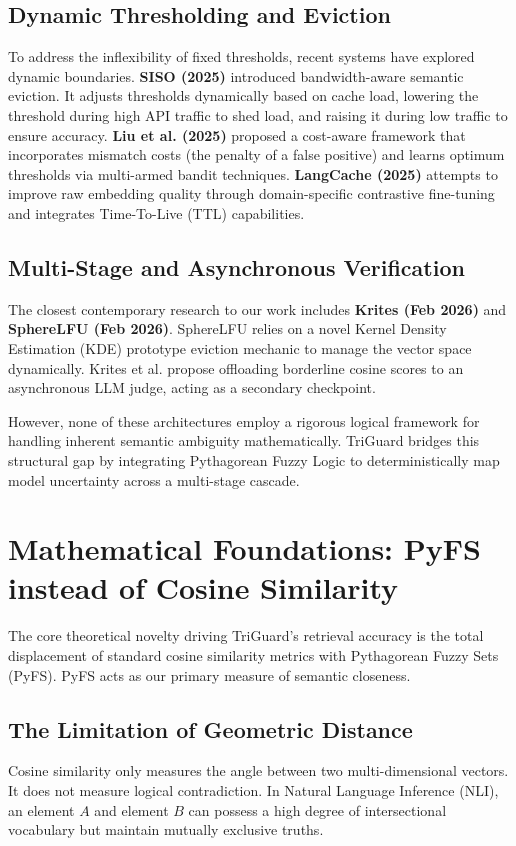 \documentclass[sigconf]{acmart}
\begin{document}
\subsection{Dynamic Thresholding and Eviction}
To address the inflexibility of fixed thresholds, recent systems have explored dynamic boundaries.
\textbf{SISO (2025)} introduced bandwidth-aware semantic eviction. It adjusts thresholds dynamically based on cache load, lowering the threshold during high API traffic to shed load, and raising it during low traffic to ensure accuracy. 
\textbf{Liu et al. (2025)} proposed a cost-aware framework that incorporates mismatch costs (the penalty of a false positive) and learns optimum thresholds via multi-armed bandit techniques.
\textbf{LangCache (2025)} attempts to improve raw embedding quality through domain-specific contrastive fine-tuning and integrates Time-To-Live (TTL) capabilities.

\subsection{Multi-Stage and Asynchronous Verification}
The closest contemporary research to our work includes \textbf{Krites (Feb 2026)} and \textbf{SphereLFU (Feb 2026)}. SphereLFU relies on a novel Kernel Density Estimation (KDE) prototype eviction mechanic to manage the vector space dynamically. Krites et al. propose offloading borderline cosine scores to an asynchronous LLM judge, acting as a secondary checkpoint.

However, none of these architectures employ a rigorous logical framework for handling inherent semantic ambiguity mathematically. TriGuard bridges this structural gap by integrating Pythagorean Fuzzy Logic to deterministically map model uncertainty across a multi-stage cascade.

\section{Mathematical Foundations: PyFS instead of Cosine Similarity}
\label{sec:math}

The core theoretical novelty driving TriGuard’s retrieval accuracy is the total displacement of standard cosine similarity metrics with Pythagorean Fuzzy Sets (PyFS). PyFS acts as our primary measure of semantic closeness.

\subsection{The Limitation of Geometric Distance}
Cosine similarity only measures the angle between two multi-dimensional vectors. It does not measure logical contradiction. In Natural Language Inference (NLI), an element $A$ and element $B$ can possess a high degree of intersectional vocabulary but maintain mutually exclusive truths.
\end{document}
